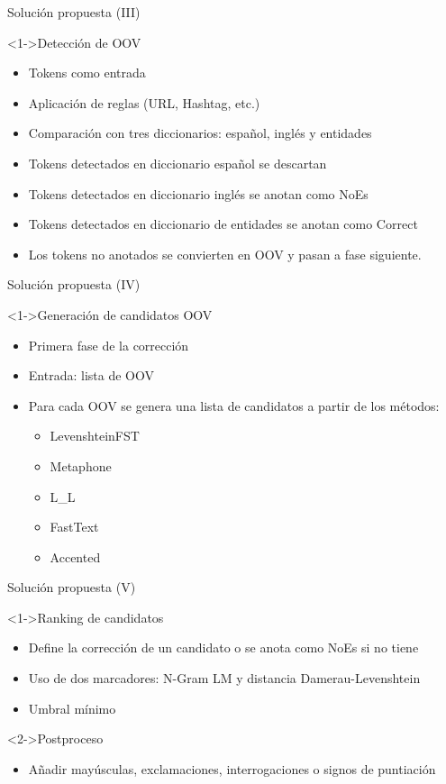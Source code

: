 \begin{tframe}{Soluci\'on propuesta (III)}
	\begin{block}<1->{Detecci\'on de OOV}
		\begin{itemize}
			\item Tokens como entrada
			\item Aplicaci\'on de reglas (URL, Hashtag, etc.)
			\item Comparaci\'on con tres diccionarios: espa\~nol, ingl\'es y entidades
			\item Tokens detectados en diccionario espa\~nol se descartan
			\item Tokens detectados en diccionario ingl\'es se anotan como NoEs
			\item Tokens detectados en diccionario de entidades se anotan como Correct
			\item Los tokens no anotados se convierten en OOV y pasan a fase siguiente.
		\end{itemize}
	\end{block}
\end{tframe}

\begin{tframe}{Soluci\'on propuesta (IV)}
	\begin{block}<1->{Generaci\'on de candidatos OOV}
		\begin{itemize}
			\item Primera fase de la correcci\'on
			\item Entrada: lista de OOV
			\item Para cada OOV se genera una lista de candidatos a partir de los m\'etodos:
			\begin{itemize}
				\item LevenshteinFST
				\item Metaphone
				\item L\_L
				\item FastText
				\item Accented
			\end{itemize}
		\end{itemize}
	\end{block}
\end{tframe}

\begin{tframe}{Soluci\'on propuesta (V)}
	\begin{block}<1->{Ranking de candidatos}
		\begin{itemize}
			\item Define la correcci\'on de un candidato o se anota como NoEs si no tiene
			\item Uso de dos marcadores: N-Gram LM y distancia Damerau-Levenshtein
			\item Umbral m\'inimo
		\end{itemize}
	\end{block}
	\begin{block}<2->{Postproceso}
		\begin{itemize}
			\item A\~nadir may\'usculas, exclamaciones, interrogaciones o signos de puntiaci\'on
		\end{itemize}
	\end{block}
\end{tframe}

